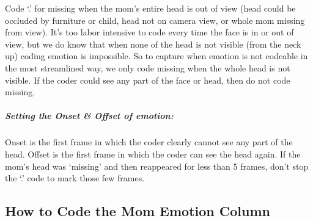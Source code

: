 \documentclass[
  12pt,
]{book}
\begin{document}
Code `.' for missing when the mom's entire head is out of view (head could be occluded by furniture or child, head not on camera view, or whole mom missing from view). It's too labor intensive to code every time the face is in or out of view, but we do know that when none of the head is not visible (from the neck up) coding emotion is impossible. So to capture when emotion is not codeable in the most streamlined way, we only code missing when the whole head is not visible. If the coder could see any part of the face or head, then do not code missing.

\hypertarget{setting-the-onset-offset-of-emotion-3}{%
\subparagraph{Setting the Onset \& Offset of emotion:}\label{setting-the-onset-offset-of-emotion-3}}

Onset is the first frame in which the coder clearly cannot see any part of the head.
Offset is the first frame in which the coder can see the head again.
If the mom's head was `missing' and then reappeared for less than 5 frames, don't stop the `.' code to mark those few frames.

\hypertarget{how-to-code-the-mom-emotion-column}{%
\subsection{How to Code the Mom Emotion Column}\label{how-to-code-the-mom-emotion-column}}
\end{document}
